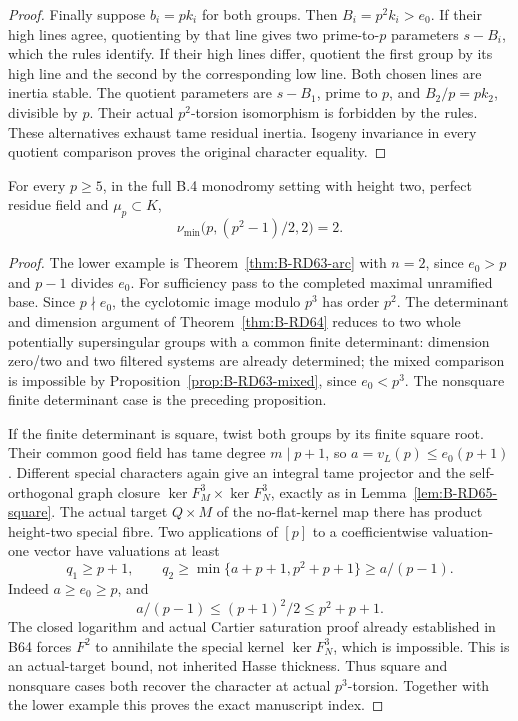 \begin{proof}
Finally suppose $b_i=pk_i$ for both groups. Then
$B_i=p^2k_i>e_0$. If their high lines agree, quotienting by that
line gives two prime-to-$p$ parameters $s-B_i$, which the rules
identify. If their high lines differ, quotient the first group
by its high line and the second by the corresponding low line.
Both chosen lines are inertia stable. The quotient parameters are
$s-B_1$, prime to $p$, and $B_2/p=pk_2$, divisible by $p$.
Their actual $p^2$-torsion isomorphism is forbidden by the rules.
These alternatives exhaust tame residual inertia. Isogeny invariance
in every quotient comparison proves the original character equality.
\end{proof}

\begin{theorem}
\label{thm:B-RD66}
For every $p\ge5$, in the full B.4 monodromy setting with height two,
perfect residue field and $\mu_p\subset K$,
\[
                    \nu_{\min}\bigl(p,(p^2-1)/2,2\bigr)=2.
                                                        \tag{B-RD66.7}
\]
\end{theorem}
\begin{proof}
The lower example is Theorem~\ref{thm:B-RD63-arc} with $n=2$,
since $e_0>p$ and $p-1$ divides $e_0$.
For sufficiency pass to the completed maximal unramified base.
Since $p\nmid e_0$, the cyclotomic image modulo $p^3$ has order $p^2$.
The determinant and dimension argument of Theorem~\ref{thm:B-RD64}
reduces to two whole potentially supersingular groups with a common
finite determinant: dimension zero/two and two filtered systems are
already determined; the mixed comparison is impossible by
Proposition~\ref{prop:B-RD63-mixed}, since $e_0<p^3$.
The nonsquare finite determinant case is the preceding proposition.

If the finite determinant is square, twist both groups by its finite
square root. Their common good field has tame degree $m\mid p+1$,
so $a=v_L(p)\le e_0(p+1)$. Different special characters again give
an integral tame projector and the self-orthogonal graph closure
$\ker F_M^3\times\ker F_N^3$, exactly as in
Lemma~\ref{lem:B-RD65-square}. The actual target $Q\times M$ of
the no-flat-kernel map there has product height-two special fibre.
Two applications of $[p]$ to a coefficientwise valuation-one vector
have valuations at least
\[
 q_1\ge p+1,\qquad q_2\ge\min\{a+p+1,p^2+p+1\}\ge a/(p-1).
                                                        \tag{B-RD66.8}
\]
Indeed $a\ge e_0\ge p$, and
\[
     a/(p-1)\le(p+1)^2/2\le p^2+p+1.
\]
The closed logarithm and actual Cartier saturation proof already
established in B64 forces $F^2$ to annihilate the special kernel
$\ker F_N^3$, which is impossible. This is an actual-target bound,
not inherited Hasse thickness. Thus square and nonsquare cases
both recover the character at actual $p^3$-torsion. Together with
the lower example this proves the exact manuscript index.
\end{proof}

